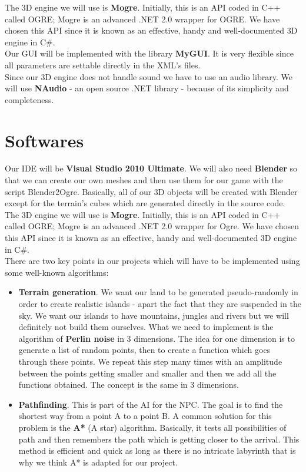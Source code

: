 \documentclass[article]{report} %
\begin{document}
						The 3D engine we will use is \textbf{\ac{Mogre}}. Initially, this is an \ac{API} coded in C++ called OGRE; Mogre is an advanced .NET 2.0 wrapper for OGRE. We have chosen this \ac{API} since it is known as an effective, handy and well-documented 3D engine in C\#.\\			
						Our \ac{GUI} will be implemented with the library \textbf{\ac{MyGUI}}. It is very flexible since all parameters are settable directly in the XML\textquoteright s files.\\	
						Since our 3D engine does not handle sound we have to use an audio library. We will use \textbf{NAudio} - an open source .NET library - because of its simplicity and completeness.
						
						\section{Softwares}
						
							Our \ac{IDE} will be \textbf{Visual Studio 2010 Ultimate}. We will also need \textbf{Blender} so that we can create our own meshes and then use them for our game with the script Blender2Ogre. Basically, all of our 3D objects will be created with Blender except for the terrain\textquoteright s cubes which are generated directly in the source code.
						The 3D engine we will use is \textbf{\ac{Mogre}}. Initially, this is an \ac{API} coded in C++ called OGRE; Mogre is an advanced .NET 2.0 wrapper for Ogre. We have chosen this \ac{API} since it is known as an effective, handy and well-documented 3D engine in C\#.\\		
							
							There are two key points in our projects which will have to be implemented using some well-known algorithms:
							\begin{itemize}
									\item \textbf{Terrain generation}. We want our land to be generated pseudo-randomly in order to create realistic islands - apart the fact that they are suspended in the sky. We want our islands to have mountains, jungles and rivers but we will definitely not build them ourselves. What we need to implement is the algorithm of \textbf{Perlin noise} in 3 dimensions. The idea for one dimension is to generate a list of random points, then to create a function which goes through these points. We repeat this step many times with an amplitude between the points getting smaller and smaller and then we add all the functions obtained. The concept is the same in 3 dimensions.\\

									\item \textbf{Pathfinding}. This is part of the \ac{AI} for the \ac{NPC}. The goal is to find the shortest way from a point A to a point B. A common solution for this problem is the \textbf{A*} (A star) algorithm. Basically, it tests all possibilities of path and then remembers the path which is getting closer to the arrival. This method is efficient and quick as long as there is no intricate labyrinth that is why we think A* is adapted for our project.
							\end{itemize}
\end{document}
